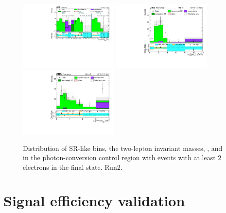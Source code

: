  \begin{figure}[h]
\centering
\includegraphics[height=3.5cm]{Figures/c6/backgrounds/FR/closureTest/Data/conversion/M-6_V-0p00202484567313_e_ele_datacard_combined_SR.pdf}
  \includegraphics[height=3.5cm]{Figures/c6/backgrounds/FR/closureTest/Data/conversion/M-6_V-0p00202484567313_e_ele_mass_datacard_combined_massl2l3.pdf}
  \includegraphics[height=3.5cm]{Figures/c6/backgrounds/FR/closureTest/Data/conversion/M-6_V-0p00202484567313_e_ele_disp_datacard_combined_displacement.pdf}
    \caption{Distribution of SR-like bins, the two-lepton invariant
    masses, \mtwol, and \Deltwod in the photon-conversion control
    region with events with at least 2 electrons in the final state. Run2.}
  \label{fig:phoConv}
\end{figure}

\clearpage
\section{Signal efficiency validation}\label{sec:llcorrection_efficiencies}

